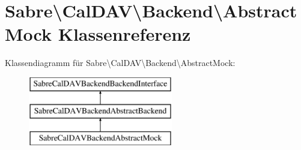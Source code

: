 \hypertarget{class_sabre_1_1_cal_d_a_v_1_1_backend_1_1_abstract_mock}{}\section{Sabre\textbackslash{}Cal\+D\+AV\textbackslash{}Backend\textbackslash{}Abstract\+Mock Klassenreferenz}
\label{class_sabre_1_1_cal_d_a_v_1_1_backend_1_1_abstract_mock}
Klassendiagramm für Sabre\textbackslash{}Cal\+D\+AV\textbackslash{}Backend\textbackslash{}Abstract\+Mock\+:\begin{figure}[H]
\begin{center}
\leavevmode
\includegraphics[height=3.000000cm]{class_sabre_1_1_cal_d_a_v_1_1_backend_1_1_abstract_mock}
\end{center}
\end{figure}
